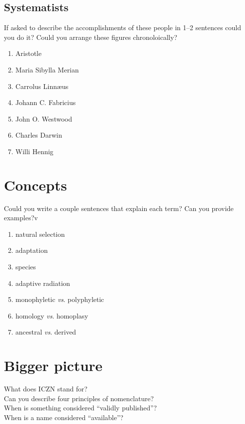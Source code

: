 \documentclass[letterpaper, 11pt]{article}
\begin{document}
\subsection{Systematists}
If asked to describe the accomplishments of these people in 1--2 sentences could you do it? Could you arrange these figures chronoloically?

\begin{enumerate} 
\item{Aristotle} 
\item{Maria Sibylla Merian}  
\item{Carrolus Linn\ae{us}}  
\item {Johann C. Fabricius}
\item{John O. Westwood}  
\item{Charles Darwin}  
\item {Willi Hennig}
\end{enumerate}

\section*{Concepts}
Could you write a couple sentences that explain each term? Can you provide examples?v

\begin{enumerate} 
\item{natural selection} 
\item{adaptation}  
\item{species}  
\item {adaptive radiation}
\item {monophyletic \textit{vs}. polyphyletic}  
\item {homology \textit{vs}. homoplasy}  
\item {ancestral \textit{vs}. derived}
\end{enumerate}

\section*{Bigger picture}
What does ICZN stand for?\\

\noindent{}Can you describe four principles of nomenclature?\\

\noindent{}When is something considered ``validly published''?\\

\noindent{}When is a name considered ``available''?\\
\end{document}
